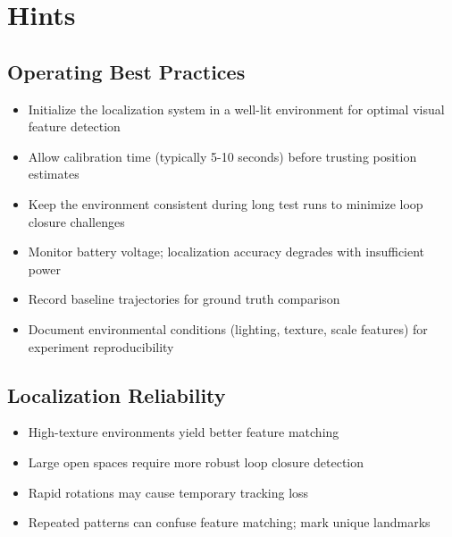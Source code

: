 %
%
%

\chapter{Hints}

\section{Operating Best Practices}

\begin{itemize}
    \item Initialize the localization system in a well-lit environment for optimal visual feature detection
    \item Allow calibration time (typically 5-10 seconds) before trusting position estimates
    \item Keep the environment consistent during long test runs to minimize loop closure challenges
    \item Monitor battery voltage; localization accuracy degrades with insufficient power
    \item Record baseline trajectories for ground truth comparison
    \item Document environmental conditions (lighting, texture, scale features) for experiment reproducibility
\end{itemize}

\section{Localization Reliability}

\begin{itemize}
    \item High-texture environments yield better feature matching
    \item Large open spaces require more robust loop closure detection
    \item Rapid rotations may cause temporary tracking loss
    \item Repeated patterns can confuse feature matching; mark unique landmarks
\end{itemize}

